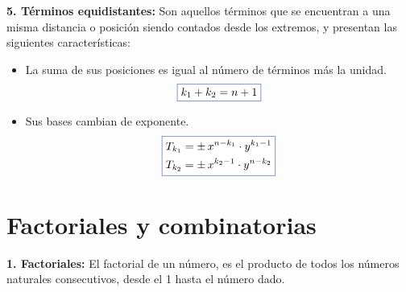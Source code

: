 \documentclass[11pt,a4paper]{article}
\newcommand{\caja}[1]{\fcolorbox{azul}{white}{#1}}
\begin{document}
\medskip
\textbf{5. Términos equidistantes:} Son aquellos términos que se encuentran a una misma
distancia o posición siendo contados desde los extremos, y presentan las siguientes
características:
\begin{itemize}[label=\textcolor{naranja}{\checkmark}]
  \item La suma de sus posiciones es igual al número de términos más la unidad.
  \[\caja{$k_1 + k_2 = n + 1$}\]
  \item Sus bases cambian de exponente.
  \[\caja{$\begin{aligned}
    T_{k_1} &= \pm\, x^{n-k_1}\cdot y^{k_1-1}\\
    T_{k_2} &= \pm\, x^{k_2-1}\cdot y^{n-k_2}
  \end{aligned}$}\]
\end{itemize}

\newpage
\section{Factoriales y combinatorias}

\textbf{1. Factoriales:} El factorial de un número, es el producto de todos los números
naturales consecutivos, desde el 1 hasta el número dado.
\end{document}
